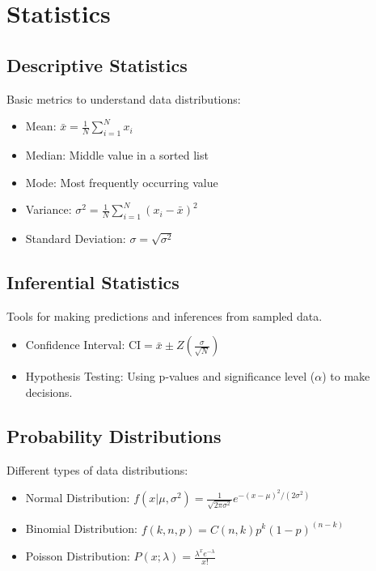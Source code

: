 \documentclass[english, threecolumn]{latex4ei/latex4ei_sheet}
\begin{document}
\section{Statistics}
\begin{sectionbox}
\subsection{Descriptive Statistics}
Basic metrics to understand data distributions:
\begin{itemize}
    \item Mean: \(\bar{x} = \frac{1}{N} \sum_{i=1}^{N} x_i\)
    \item Median: Middle value in a sorted list
    \item Mode: Most frequently occurring value
    \item Variance: \(\sigma^2 = \frac{1}{N} \sum_{i=1}^{N} (x_i - \bar{x})^2\)
    \item Standard Deviation: \(\sigma = \sqrt{\sigma^2}\)
\end{itemize}

\subsection{Inferential Statistics}
Tools for making predictions and inferences from sampled data.
\begin{itemize}
    \item Confidence Interval: \( \text{CI} = \bar{x} \pm Z \left( \frac{\sigma}{\sqrt{N}} \right)\)
    \item Hypothesis Testing: Using p-values and significance level (\(\alpha\)) to make decisions.
\end{itemize}

\subsection{Probability Distributions}
Different types of data distributions:
\begin{itemize}
    \item Normal Distribution: \( f(x|\mu, \sigma^2) = \frac{1}{\sqrt{2\pi\sigma^2}} e^{-(x-\mu)^2/(2\sigma^2)} \)
    \item Binomial Distribution: \( f(k, n, p) = C(n, k) p^k (1-p)^{(n-k)} \)
    \item Poisson Distribution: \( P(x; \lambda) = \frac{\lambda^x e^{-\lambda}}{x!} \)
\end{itemize}


\end{sectionbox}
\end{document}
